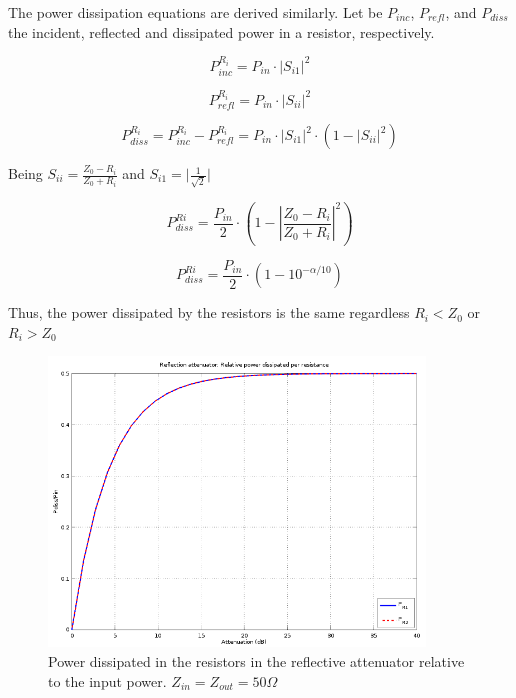 \noindent The power dissipation equations are derived similarly. Let be $P_{inc}$, $P_{refl}$, and $P_{diss}$ the incident, reflected and dissipated power in a resistor, respectively.
 
 \begin{equation}
 	P_{inc}^{R_i} = P_{in} \cdot \lvert S_{i1} \rvert^2
 \end{equation}
 
 \begin{equation}
 	P_{refl}^{R_i} = P_{in} \cdot \lvert S_{ii} \rvert^2
 \end{equation}
  
 \begin{equation}
 	P_{diss}^{R_i} = P_{inc}^{R_i} - P_{refl}^{R_i} = P_{in} \cdot \lvert S_{i1} \rvert^2 \cdot (1 - \lvert S_{ii} \rvert^2)
 \end{equation}
 
\noindent Being $S_{ii} = \frac{Z_0 - R_i}{Z_0 + R_i}$ and $S_{i1} = \lvert \frac{1}{\sqrt{2}}\rvert$
 
 \begin{equation}
 	  P_{diss}^{Ri} = \frac{P_{in}}{2} \cdot \left( 1  - \left| \frac{Z_0 - R_i}{Z_0 + R_i}\right|^2\right)
 \end{equation}
 
 \begin{equation}
  	P_{diss}^{Ri} = \frac{P_{in}}{2} \cdot \left( 1 - 10^{-\alpha/10}\right)
 \end{equation}
 
\noindent Thus, the power dissipated by the resistors is the same regardless $R_i < Z_0$ or $R_i > Z_0$
  
  \begin{figure}[ht]
    \centering
    \includegraphics[width=10cm]{./images/reflective-att-relative-power-dissipation-50-Ohm.png}
    \caption{Power dissipated in the resistors in the reflective attenuator relative to the input power. $Z_{in} = Z_{out} = 50 \Omega$}
    \label{fig:reflective-att-relative-power-dissipation-50-Ohm}
  \end{figure}